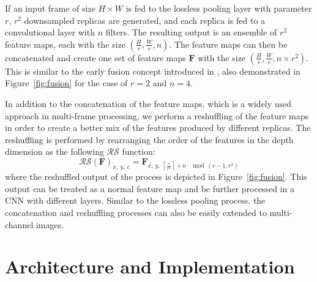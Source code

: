 \documentclass[10pt,twocolumn,letterpaper]{article}
\begin{document}
If an input frame of size $H \times W$ is fed to the lossless pooling layer with parameter $r$, $r^2$ 
downsampled replicas are generated, and each replica is fed to a convolutional layer with $n$ filters. The resulting
output is an ensemble of $r^2$ feature maps, each with the size $(\frac{H}{r}, \frac{W}{r}, n)$. The feature
maps can then be concatenated and create one set of feature maps $\mathbf{F}$ with the size $(\frac{H}{r}, \frac{W}{r}, n \times r^2)$.
This is similar to the early fusion concept introduced in \cite{caballero2017,kappeler2016}, also demonstrated
in Figure~\ref{fig:fusion} for the case of $r=2$ and $n=4$.

In addition to the concatenation of the feature maps, which is a widely used approach in multi-frame processing, we 
perform a reshuffling of the feature maps in order to create a better mix of the features produced by different replicas.
The reshuffling is performed by rearranging the order of the features in the depth dimension as the following $\mathcal{RS}$
function:
\begin{equation}
\label{eq:reshuffling}
{\mathcal{RS}(\mathbf{F})}_{x,\ y,\ c} = {\mathbf{F}}_{x,\ y,\ \left \lceil \frac{c}{r^2} \right \rceil + n \cdot \bmod(c-1, r^2)} 
\end{equation}
where the reshuffled output of the process is depicted in Figure~\ref{fig:fusion}. This output can be treated
as a normal feature map and be further processed in a CNN with different layers. Similar to the lossless pooling
process, the concatenation and reshuffling processes can also be easily extended to multi-channel images.

\section{Architecture and Implementation}
\label{architecture}
\end{document}
